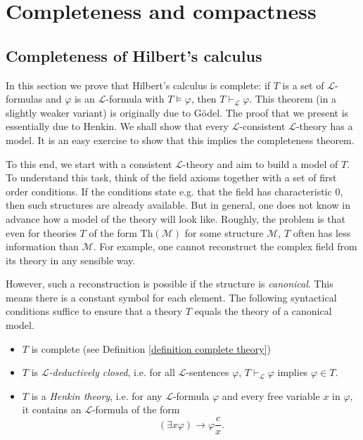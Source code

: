 \documentclass[a4paper, 11pt]{amsart}
\theoremstyle{remark}
\newcommand{\Th}{\mathrm{Th}}
\newcommand{\cL}{\mathcal L}
\newcommand{\cM}{\mathcal M}
\begin{document}
\newpage 

\section{Completeness and compactness} 


\subsection{Completeness of Hilbert's calculus} 

In this section we prove that Hilbert's calculus is complete: if $T$ is a set of $\cL$-formulas and $\varphi$ is an $\cL$-formula with $T\models \varphi$, then $T\vdash_\cL \varphi$. 
This theorem (in a slightly weaker variant) is originally due to G\"odel. The proof that we present is essentially due to Henkin. 
We shall show that every $\cL$-consistent $\cL$-theory has a model. 
It is an easy exercise to show that this implies the completeness theorem. 

To this end, we start with a consistent $\cL$-theory and aim to build a model of $T$. 
To understand this task, think of the field axioms together with a set of first order conditions. 
If the conditions state e.g. that the field has characteristic $0$, then such structures are already available. 
But in general, one does not know in advance how a model of the theory will look like.  
Roughly, the problem is that even for theories $T$ of the form $\Th(\cM)$ for some structure $\cM$, $T$ often has less information than $\cM$.  
For example, one cannot reconstruct the complex field from its theory in any sensible way.  

However, such a reconstruction is possible if the structure is \emph{canonical}. 
This means there is a constant symbol for each element. 
The following syntactical conditions suffice to ensure that a theory $T$ equals the theory of a canonical model. 

\begin{itemize} 
\item 
$T$ is complete (see Definition \ref{definition complete theory})
\item 
$T$ is \emph{$\cL$-deductively closed}, i.e. for all $\cL$-sentences $\varphi$, $T\vdash_\cL \varphi$ implies $\varphi\in T$. 
\item 
$T$ is a \emph{Henkin theory}, i.e. for any $\cL$-formula $\varphi$ and every free variable $x$ in $\varphi$, it contains an $\cL$-formula of the form 
$$(\exists x \varphi) \rightarrow \varphi\frac{c}{x}.$$ 
\end{itemize} 
\end{document}
